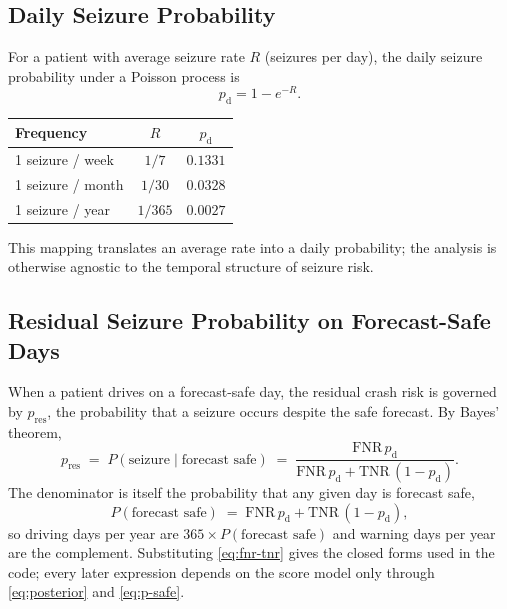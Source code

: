\documentclass[11pt]{article}
\numberwithin{equation}{section}
\newcommand{\pd}{p_{\mathrm{d}}}
\newcommand{\pres}{p_{\mathrm{res}}}
\begin{document}
\subsection{Daily Seizure Probability}
\label{sec:daily-prob}

For a patient with average seizure rate $R$ (seizures per day), the daily seizure
probability under a Poisson process is
\begin{equation}
\pd = 1 - e^{-R}.
\label{eq:daily-prob}
\end{equation}
\begin{center}
\begin{tabular}{lcc}
\toprule
Frequency & $R$ & $\pd$ \\
\midrule
1 seizure / week  & $1/7$   & $0.1331$ \\
1 seizure / month & $1/30$  & $0.0328$ \\
1 seizure / year  & $1/365$ & $0.0027$ \\
\bottomrule
\end{tabular}
\end{center}
This mapping translates an average rate into a daily probability; the analysis is
otherwise agnostic to the temporal structure of seizure risk.

\subsection{Residual Seizure Probability on Forecast-Safe Days}
\label{sec:posterior}

When a patient drives on a forecast-safe day, the residual crash risk is governed by
$\pres$, the probability that a seizure occurs despite the safe forecast. By Bayes'
theorem,
\begin{equation}
\pres \;=\; P(\text{seizure} \mid \text{forecast safe}) \;=\;
\frac{\mathrm{FNR}\,\pd}{\mathrm{FNR}\,\pd + \mathrm{TNR}\,(1 - \pd)}.
\label{eq:posterior}
\end{equation}
The denominator is itself the probability that any given day is forecast safe,
\begin{equation}
P(\text{forecast safe}) \;=\; \mathrm{FNR}\,\pd + \mathrm{TNR}\,(1 - \pd),
\label{eq:p-safe}
\end{equation}
so driving days per year are $365 \times P(\text{forecast safe})$ and warning days per
year are the complement. Substituting \eqref{eq:fnr-tnr} gives the closed forms used in
the code; every later expression depends on the score model only through
\eqref{eq:posterior} and \eqref{eq:p-safe}.
\end{document}
